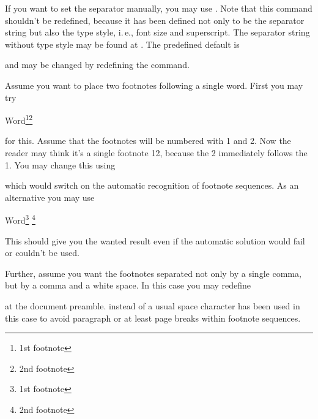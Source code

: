 If you want to set the separator manually, you may use
. Note that this command shouldn't be
redefined, because it has been defined not only to be the separator string but
also the type style, i.\,e., font size and superscript. The separator string
without type style may be found at . The
predefined default is
\begin{lstcode}[belowskip=\dp\strutbox]
  \newcommand*{\multfootsep}{,}
\end{lstcode}
and may be changed by redefining the command.

\ifCommonscrlttr\else
\begin{Example}
  \label{desc:maincls.cmd.footnote.example}%
  Assume you want to place two footnotes following a single word. First you may try
\begin{lstcode}
  Word\footnote{1st footnote}\footnote{2nd footnote}
\end{lstcode}
  for this. Assume that the footnotes will be numbered with 1 and 2. Now the
  reader may think it's a single footnote 12, because the 2
  immediately follows the 1. You may change this using
\begin{lstcode}
\end{lstcode}
  which would switch on the automatic recognition of footnote sequences. As an
  alternative you may use
\begin{lstcode}
  Word\footnote{1st footnote}%
  \multiplefootnoteseparator
  \footnote{2nd footnote}
\end{lstcode}
  This should give you the wanted result even if the automatic solution would
  fail or couldn't be used.

  Further, assume you want the footnotes separated not only by a single
  comma, but by a comma and a white space. In this case you may redefine
\begin{lstcode}
  \renewcommand*{\multfootsep}{,\nobreakspace}
\end{lstcode}
  at the document preamble. 
  instead of a usual space character has been used in this case to avoid
  paragraph or at least page breaks within footnote sequences.
\end{Example}%
\fi%
%
%
%
%
%
%
\fi %


